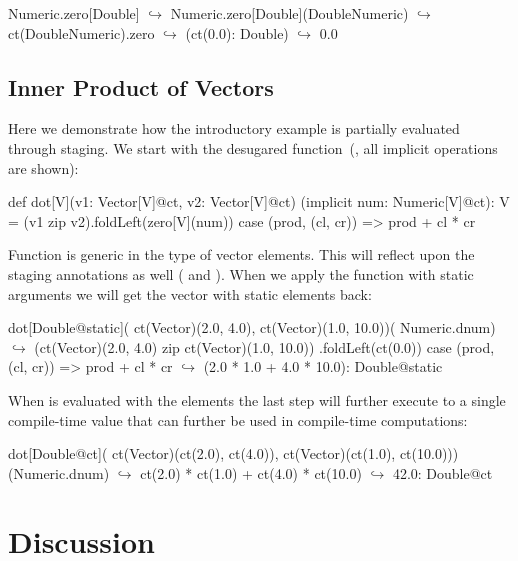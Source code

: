 \begin{lstparagraph}
Numeric.zero[Double]
  $\hookrightarrow$ Numeric.zero[Double](DoubleNumeric)
  $\hookrightarrow$ ct(DoubleNumeric).zero
  $\hookrightarrow$ (ct(0.0): Double)
  $\hookrightarrow$ 0.0
\end{lstparagraph}

\subsection{Inner Product of Vectors}
\label{sct:dot-product}

Here we demonstrate how the introductory example is partially evaluated through staging.
 We start with the desugared  function~(\ie, all implicit operations are shown):

\begin{lstparagraph}
 def dot[V](v1: Vector[V]@ct, v2: Vector[V]@ct)
  (implicit num: Numeric[V]@ct): V =
  (v1 zip v2).foldLeft(zero[V](num)) {
    case (prod, (cl, cr)) => prod + cl * cr
  }
\end{lstparagraph}

Function  is generic in the type of vector elements. This will reflect
upon the staging annotations as well ( and ). When we apply the
 function with static arguments we will get the vector with static elements back:

\begin{lstparagraph}
dot[Double@static](
  ct(Vector)(2.0, 4.0), ct(Vector)(1.0, 10.0))(
  Numeric.dnum)
$\hookrightarrow$
  (ct(Vector)(2.0, 4.0) zip ct(Vector)(1.0, 10.0))
    .foldLeft(ct(0.0)) {
      case (prod, (cl, cr)) => prod + cl * cr
    }
$\hookrightarrow$ (2.0 * 1.0 + 4.0 * 10.0): Double@static
\end{lstparagraph}

When  is evaluated with the  elements the last step will further
execute to a single compile-time value that can further be used in compile-time computations:
\begin{lstparagraph}
dot[Double@ct](
  ct(Vector)(ct(2.0), ct(4.0)),
  ct(Vector)(ct(1.0), ct(10.0)))(Numeric.dnum)
$\hookrightarrow$ ct(2.0) * ct(1.0) + ct(4.0) * ct(10.0)
$\hookrightarrow$ 42.0: Double@ct
\end{lstparagraph}




\section{Discussion}
\label{sct:discussion}

